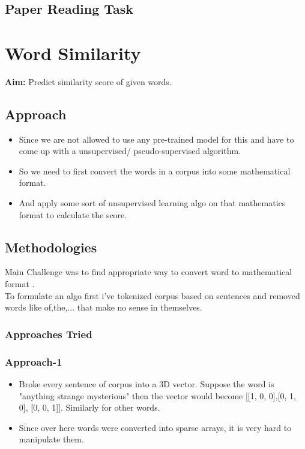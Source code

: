 \documentclass{article}
\begin{document}
\subsection*{Paper Reading Task}


\newpage
\section{Word Similarity}
\textbf{Aim: } Predict similarity score of given words.

\subsection{Approach}
\begin{itemize}
\item Since we are not allowed to use any pre-trained model for this and have to come up with a unsupervised/ pseudo-supervised algorithm.

\item So we need to first convert the words in a corpus into some mathematical format.

\item And apply some sort of unsupervised learning algo on that mathematics format to calculate the score.
\end{itemize}
 

\subsection{Methodologies}
Main Challenge was to find appropriate way to convert word to mathematical format \cite{VectoringWords-video, VectoringWords-blog}.\\
To formulate an algo first i've tokenized corpus based on sentences and removed words like of,the,... that make no sense in themselves. 
\subsubsection{Approaches Tried}
\subsubsection*{Approach-1}\label{subsec:approach-1}
\begin{itemize}
\item Broke every sentence of corpus into a 3D vector. Suppose the word is "anything strange mysterious" then the vector would become [[1, 0, 0],[0, 1, 0], [0, 0, 1]]. Similarly for other words.
\item Since over here words were converted into sparse arrays, it is very hard to manipulate them.
\end{itemize}
\end{document}
